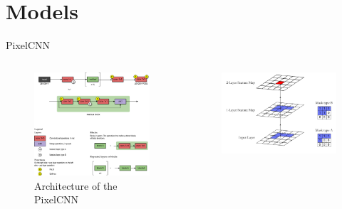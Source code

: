 \documentclass[t]{beamer}  %
\begin{document}
\section{Models}
\begin{frame}[t]{PixelCNN \cite{pixel}}
\vspace{-8ex}
\begin{columns}[t]
\begin{column}{.6\textwidth}
\begin{figure}[h]
            \centering
            \includegraphics[scale=0.52]{pixelcnn.png}
            \\ \scriptsize Architecture of the PixelCNN
        \end{figure}
\end{column}
\hspace{1mm}
\begin{column}{.35\textwidth}
\vspace{5ex}
\begin{figure}[c]
            \centering
            \includegraphics[scale=0.15]{mask1.png}

\end{figure}
\end{column}
\end{columns}
\end{frame}
\end{document}
